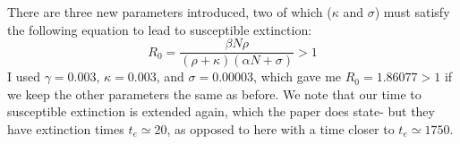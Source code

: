 \documentclass[]{article}
\begin{document}
\begin{figure}[H]
\end{figure}

There are three new parameters introduced, two of which ($\kappa$ and $\sigma$)
must satisfy the following equation to lead to susceptible extinction:
\begin{equation}
    R_0 = \frac{\beta N \rho} {(\rho + \kappa)(\alpha N + \sigma)} > 1
\end{equation}
I used $\gamma = 0.003$, $\kappa = 0.003$, and $\sigma = 0.00003$, which gave me $R_0 = 1.86077 > 1$ if we keep the other parameters the same as before. We note that our time to susceptible extinction is extended again, which the paper does state- but they have extinction times $t_e \simeq 20$, as opposed to here with a time closer to $t_e \simeq 1750$.

\begin{figure}[H]
\end{figure}
\end{document}
